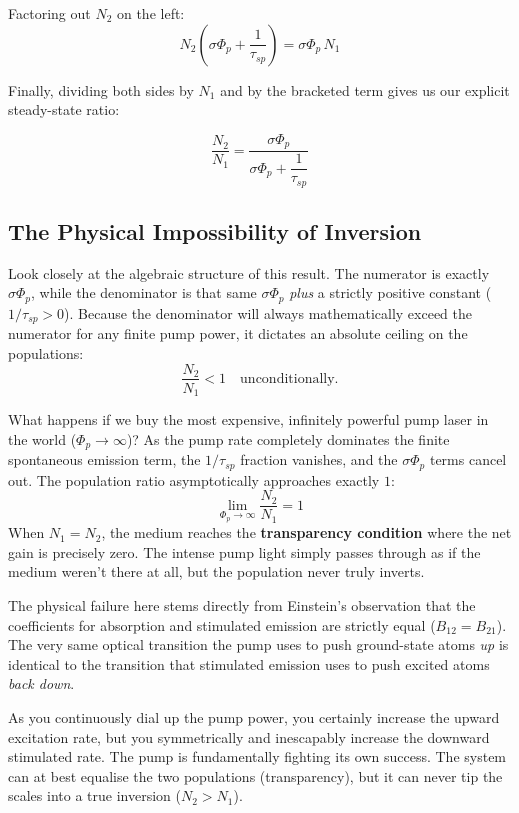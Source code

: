 Factoring out $N_2$ on the left:
\begin{equation*}
    N_2\!\left(\sigma\Phi_p + \frac{1}{\tau_{sp}}\right) = \sigma\Phi_p\,N_1
\end{equation*}

Finally, dividing both sides by $N_1$ and by the bracketed term gives us our explicit steady-state ratio:
\begin{keyresult}
    \begin{equation}
        \frac{N_2}{N_1} = \frac{\sigma\Phi_p}{\sigma\Phi_p + \dfrac{1}{\tau_{sp}}}
    \end{equation}
\end{keyresult}

\subsection{The Physical Impossibility of Inversion}

Look closely at the algebraic structure of this result. The numerator is exactly $\sigma\Phi_p$, while the denominator is that same $\sigma\Phi_p$ \emph{plus} a strictly positive constant ($1/\tau_{sp} > 0$). Because the denominator will always mathematically exceed the numerator for any finite pump power, it dictates an absolute ceiling on the populations:
\begin{equation*}
    \frac{N_2}{N_1} < 1 \quad \text{unconditionally.}
\end{equation*}

What happens if we buy the most expensive, infinitely powerful pump laser in the world ($\Phi_p \to \infty$)? As the pump rate completely dominates the finite spontaneous emission term, the $1/\tau_{sp}$ fraction vanishes, and the $\sigma\Phi_p$ terms cancel out. The population ratio asymptotically approaches exactly $1$:
\begin{equation*}
    \lim_{\Phi_p \to \infty} \frac{N_2}{N_1} = 1
\end{equation*}
When $N_1 = N_2$, the medium reaches the \textbf{transparency condition} where the net gain is precisely zero. The intense pump light simply passes through as if the medium weren't there at all, but the population never truly inverts.

\begin{keyinsight}
    The physical failure here stems directly from Einstein's observation that the coefficients for absorption and stimulated emission are strictly equal ($B_{12} = B_{21}$). The very same optical transition the pump uses to push ground-state atoms \emph{up} is identical to the transition that stimulated emission uses to push excited atoms \emph{back down}.

    As you continuously dial up the pump power, you certainly increase the upward excitation rate, but you symmetrically and inescapably increase the downward stimulated rate. The pump is fundamentally fighting its own success. The system can at best equalise the two populations (transparency), but it can never tip the scales into a true inversion ($N_2 > N_1$).
\end{keyinsight}


